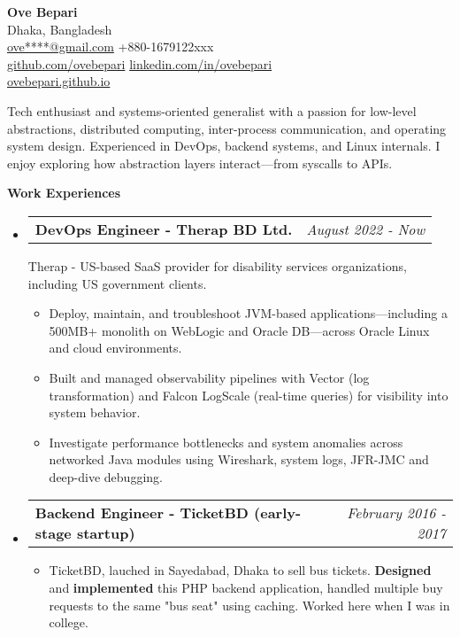 \documentclass[legalpaper,10pt]{article}
\makeatletter
\newcommand{\resheading}[1]{{\large \colorbox{mygrey}{\begin{minipage}{\textwidth}{\textbf{#1 \vphantom{p\^{E}}}}\end{minipage}}}}
\newcommand{\ressubheading}[4]{
	\begin{tabular*}{7.1in}{l@{\extracolsep{\fill}}r}
		\textbf{#1} & \textit{#4} \\
	\end{tabular*}\vspace{-6pt}}
\makeatother
\begin{document}
    \begin{center}
        \textbf{\Large Ove Bepari} \\
        Dhaka, Bangladesh \\
        \href{mailto:ove****@gmail.com}{ove****@gmail.com} \quad
        +880-1679122xxx \\
        \href{https://github.com/ovebepari}{github.com/ovebepari} \quad
        \href{https://linkedin.com/in/ovebepari}{linkedin.com/in/ovebepari} \\
        \href{https://ovebepari.github.io}{ovebepari.github.io} \quad
    \end{center}

    \vspace{0.20in}
	Tech enthusiast and systems-oriented generalist with a passion for low-level abstractions, distributed computing,  inter-process communication, and operating system design. Experienced in DevOps, backend systems, and Linux internals. I enjoy exploring how abstraction layers interact—from syscalls to APIs.
	
	\vspace{0.15in}
	\resheading{Work Experiences}
	\begin{itemize}
	
		\item \ressubheading{DevOps Engineer - Therap BD Ltd.}{}{}{August 2022 - Now}
		
        \vspace{0.05in}
        Therap - US-based SaaS provider for disability services organizations, including US government clients.
        
        \begin{itemize} 
        
        \item Deploy, maintain, and troubleshoot JVM-based applications—including a 500MB+ monolith on WebLogic and Oracle DB—across Oracle Linux and cloud environments.
    
        \item Built and managed observability pipelines with Vector (log transformation) and Falcon LogScale (real-time queries) for visibility into system behavior.
    
        \item Investigate performance bottlenecks and system anomalies across networked Java modules using Wireshark, system logs, JFR-JMC and deep-dive debugging.
        
		\end{itemize}	
	
		\item \ressubheading{Backend Engineer - TicketBD (early-stage startup)}{}{}{February 2016 - 2017}
		\begin{itemize} 
			\item TicketBD, lauched in Sayedabad, Dhaka to sell bus tickets. \textbf{Designed} and \textbf{implemented} this PHP backend application, handled multiple buy requests to the same "bus seat" using caching. Worked here when I was in college.
		\end{itemize}
	\end{itemize}
\end{document}
